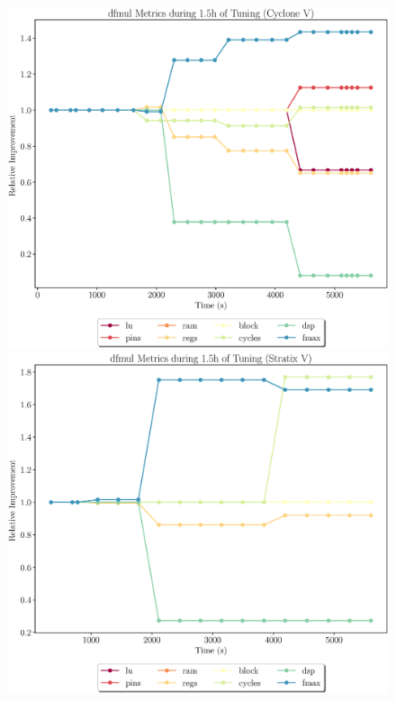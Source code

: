 \documentclass[12pt, a4paper]{article}
\begin{document}
\begin{figure}[htpb]
    \begin{minipage}{.48\textwidth}
        \includegraphics[scale=.25]{dfmul_all_5400_chstone_CycloneV}
    \end{minipage}%
    \hfill
    \begin{minipage}{.48\textwidth}
        \includegraphics[scale=.25]{dfmul_all_5400_chstone_StratixV}
    \end{minipage}%


\end{figure}
\end{document}

